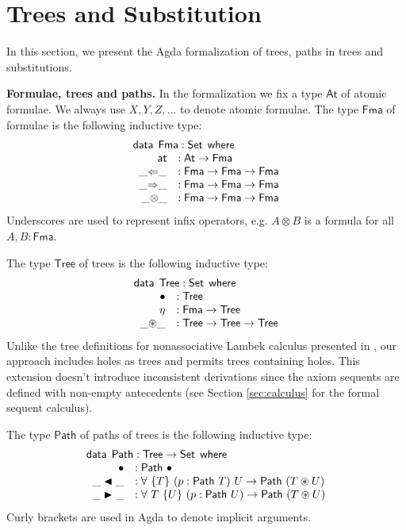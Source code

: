 \documentclass[runningheads]{llncs}
\newcommand{\ot}{\otimes}
\newcommand{\cdast}{\circledast}
\newcommand{\Larr}{\Leftarrow}
\newcommand{\Rarr}{\Rightarrow}
\newcommand{\btleft}{\blacktriangleleft}
\newcommand{\btright}{\blacktriangleright}
\newcommand{\At}{\mathsf{At}}
\newcommand{\at}{\mathsf{at}}
\newcommand{\Fma}{\mathsf{Fma}}
\newcommand{\data}{\mathsf{data}}
\newcommand{\Tree}{\mathsf{Tree}}
\newcommand{\Path}{\mathsf{Path}}
\newcommand{\path}[1]{\mathsf{Path} ~ #1}
\newcommand{\where}{\mathsf{where}}
\newcommand{\Set}{\mathsf{Set}}
\begin{document}
\section{Trees and Substitution}
In this section, we present the Agda formalization of trees, paths in trees and substitutions.

\noindent\textbf{Formulae, trees and paths.} In the formalization we fix a type $\At$ of atomic formulae. We always use $X, Y, Z,\dots$ to denote atomic formulae.
The type $\Fma$ of formulae is the following inductive type:
\[
\begin{array}{rl}
  \multicolumn{2}{l}{\data \:\:  \Fma : \Set \:\: \where} \\
  \;\; \at &: \At \to \Fma \\
  \;\; \_{\Larr}\_ &: \Fma \to \Fma \to \Fma \\ 
  \;\; \_{\Rarr}\_ &: \Fma \to \Fma \to \Fma \\ 
  \;\; \_{\ot}\_ &: \Fma \to \Fma \to \Fma \\
\end{array}
\]
Underscores are used to represent infix operators, e.g. $A \ot B$ is a formula for all $A,B : \Fma$.

The type $\Tree$ of trees is the following inductive type:
\[
\begin{array}{rl}
  \multicolumn{2}{l}{\data \:\:  \Tree : \Set \:\: \where} \\
  \;\; \bullet &: \Tree \\
  \;\; \eta &: \Fma \to \Tree \\
  \;\; \_{\cdast}\_ &: \Tree \to \Tree \to \Tree \\
\end{array}
\]
Unlike the tree definitions for nonassociative Lambek calculus presented in \cite{moot:categorial:2012}, our approach includes holes as trees and permits trees containing holes. This extension doesn't introduce inconsistent derivations since the axiom sequents are defined with non-empty antecedents (see Section \ref{sec:calculus} for the formal sequent calculus).

The type $\Path$ of paths of trees is the following inductive type:
\[
\begin{array}{rl}
  \multicolumn{2}{l}{\data \:\:  \Path : \Tree \to \Set \:\: \where} \\
  \;\; \bullet &: \path{\bullet} \\
  \;\; \_\btleft\_ &: \forall ~ \{T\} ~ (p : \path{T}) ~ U \to \path{(T \cdast U)} \\
  \;\; \_\btright\_ &: \forall ~ T ~ \{U\} ~ (p : \path{U}) \to \path{(T \cdast U)}
\end{array}
\]
Curly brackets are used in Agda to denote implicit arguments.
\end{document}
